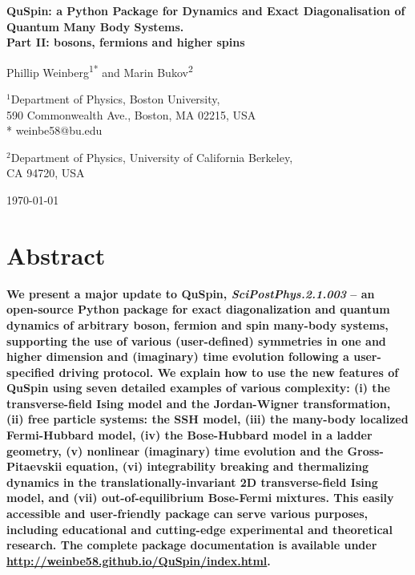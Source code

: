 \documentclass{SciPost}
\newcommand\0{\scalebox{-1}[1]{0}}
\begin{document}
\begin{center}{\Large \textbf{
QuSpin: a Python Package for Dynamics and Exact Diagonalisation of Quantum Many Body Systems.\\
\large Part II: bosons, fermions and higher spins
}}\end{center}

\begin{center}
Phillip Weinberg\textsuperscript{1*} and Marin Bukov\textsuperscript{2}
\end{center}

\begin{center}
$^1$Department of Physics, Boston University, \\
590 Commonwealth Ave., Boston, MA 02215, USA
\\
* weinbe58@bu.edu
\end{center}

\begin{center}
$^2$Department of Physics, University of California Berkeley, \\
CA 94720, USA
\\
\end{center}

\begin{center}
\today
\end{center}


\section*{Abstract}
{\bf 
We present a major update to QuSpin, \emph{SciPostPhys.2.1.003} -- an open-source Python package for exact diagonalization and quantum dynamics of arbitrary boson, fermion and spin many-body systems, supporting the use of various (user-defined) symmetries in one and higher dimension and (imaginary) time evolution following a user-specified driving protocol. We explain how to use the new features of QuSpin using seven detailed examples of various complexity: (i) the transverse-field Ising model and the Jordan-Wigner transformation, (ii) free particle systems: the SSH model, (iii) the many-body localized Fermi-Hubbard model, (iv) the Bose-Hubbard model in a ladder geometry, (v) nonlinear (imaginary) time evolution and the Gross-Pitaevskii equation, (vi) integrability breaking and thermalizing dynamics in the translationally-invariant 2D transverse-field Ising model, and (vii) out-of-equilibrium Bose-Fermi mixtures. This easily accessible and user-friendly package can serve various purposes, including educational and cutting-edge experimental and theoretical research. The complete package documentation is available under \href{http://weinbe58.github.io/QuSpin/index.html}{http://weinbe58.github.io/QuSpin/index.html}.
}
\end{document}
